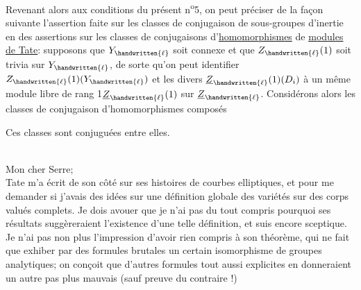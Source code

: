 Revenant alors aux conditions du présent n\textsuperscript{o}5, on peut préciser de la façon suivante l'assertion faite sur les  classes de conjugaison de sous-groupes d'inertie en des assertions sur les classes de conjugaisons d'\uline{homomorphismes} de \uline{modules de Tate}: supposons que $Y_{\handwritten{\ell}}$ soit connexe et que $Z_{\handwritten{\ell}}(1)$ soit trivia sur $Y_{\handwritten{\ell}}$,  de sorte qu'on peut identifier $Z_{\handwritten{\ell}}(1)(Y_{\handwritten{\ell}})$ et les divers $\underline{Z}_{\handwritten{\ell}}(1)(D_i)$ à un même module \handwritten{(}libre de rang 1\handwritten{)}$\underline{Z}_{\handwritten{\ell}}(1)$ sur $\underline{Z}_{\handwritten{\ell}}$. Considérons alors les classes de conjugaison d'homomorphismes composés

Ces classes sont conjuguées entre elles.


\\

Mon cher Serre;\\

Tate m'a écrit de son côté  sur ses histoires de courbes elliptiques, et pour me demander si j'avais des idées sur une définition globale des variétés  sur des corps valués complets. Je dois avouer que je n'ai pas du tout compris pourquoi ses résultats suggèreraient l'existence d'une telle définition, et suis encore sceptique. Je n'ai pas non plus l'impression d'avoir rien compris à son théorème, qui  ne fait que exhiber par des formules brutales un certain isomorphisme de groupes analytiques;  on conçoit que d'autres formules tout aussi explicites en donneraient un autre pas plus mauvais (sauf preuve du contraire !)

